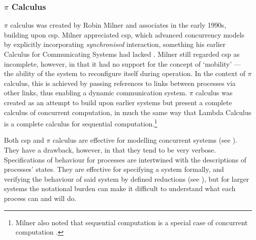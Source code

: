 \subsubsection{\(\pi\) Calculus}
\(\pi\) calculus was created by Robin Milner and associates in the early 1990s, building upon \gls{csp}.  Milner appreciated \gls{csp}, which advanced concurrency models by explicitly incorporating \emph{synchronised} interaction, something his earlier Calculus for Communicating Systems \cite{Milner1980} had lacked  \cite{Milner1993}.  Milner still regarded \gls{csp} as incomplete, however, in that it had no support for the concept of `mobility' --- \ie{} the ability of the system to reconfigure itself during operation.  In the context of \(\pi\) calculus, this is achieved by passing references to links between processes via other links, thus enabling a dynamic communication system. \(\pi\) calculus was created as an attempt to build upon earlier systems but present a complete calculus of concurrent computation, in much the same way that Lambda Calculus \cite{Barendregt1984} is a complete calculus for sequential computation.\footnote{Milner also noted that sequential computation is a special case of concurrent computation \cite{Milner1993}.}

Both \gls{csp} and \(\pi\) calculus are effective for modelling concurrent systems (see \eg{} \cite{Roscoe2011}).  They have a drawback, however, in that they tend to be very verbose.  Specifications of behaviour for processes are intertwined with the descriptions of processes' states.  They are effective for specifying a system formally, and verifying the behaviour of said system by defined reductions (see \eg{} \cite[Ch.~3.2]{Varela2013}), but for larger systems the notational burden can make it difficult to understand what each process can and will do.


